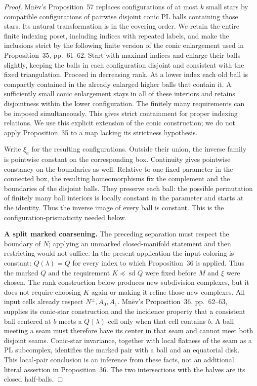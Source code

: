 \begin{proof}
Mn\"ev's Proposition~57 replaces configurations of at most \(k\) small
stars by compatible configurations of pairwise disjoint conic PL balls
containing those stars. Its natural transformation is in the covering
order. We retain the entire finite indexing poset, including indices
with repeated labels, and make the inclusions strict by the following
finite version of the conic enlargement used in Proposition~35,
pp.~61--62. Start with maximal indices and enlarge their balls slightly,
keeping the balls in each configuration disjoint and consistent with
the fixed triangulation. Proceed in decreasing rank. At a lower
index each old ball is compactly contained in the already enlarged
higher balls that contain it. A sufficiently small conic enlargement
stays in all of these interiors and retains disjointness within the
lower configuration. The finitely many requirements can be imposed
simultaneously. This gives strict containment for proper indexing
relations. We use this explicit extension of the conic construction;
we do not apply Proposition~35 to a map lacking its strictness
hypothesis.

Write \(\xi_a\) for the resulting configurations. Outside their union,
the inverse family is pointwise constant on the corresponding box.
Continuity gives pointwise constancy on the boundaries as well.
Relative to one fixed parameter in the connected box, the resulting
homeomorphisms fix the complement and the boundaries of the disjoint
balls. They preserve each ball: the possible permutation of finitely
many ball interiors is locally constant in the parameter and starts
at the identity. Thus the inverse image of every ball is constant.
This is the configuration-prismaticity needed below.

\textbf{A split marked coarsening.}\quad
The preceding separation must respect the boundary of \(N\); applying
an unmarked closed-manifold statement and then restricting would not
suffice. In the present application the input coloring is constant:
\(Q(\lambda)=Q\) for every index to which Proposition~36 is applied.
Thus the marked \(Q\) and the requirement \(K\preceq\operatorname{sd}Q\)
were fixed before \(M\) and \(\xi\) were chosen. The rank construction
below produces new subdivision complexes, but it does not require
choosing \(K\) again or making it refine those new complexes.
All input cells already respect \(N^\pm,A_0,A_1\).
Mn\"ev's Proposition~36, pp.~62--63, supplies its conic-star
construction and the incidence property that a consistent ball
centered at \(b\) meets a \(Q(\lambda)\)-cell only when that cell
contains \(b\). A ball meeting a seam must therefore have its center
in that seam and cannot meet both disjoint seams.
Conic-star invariance, together with local flatness of the seam as
a PL subcomplex, identifies the marked pair with a ball and an
equatorial disk. This local-pair conclusion is an inference from
these facts, not an additional literal assertion in Proposition~36.
The two intersections with the halves are its closed half-balls.


\end{proof}
